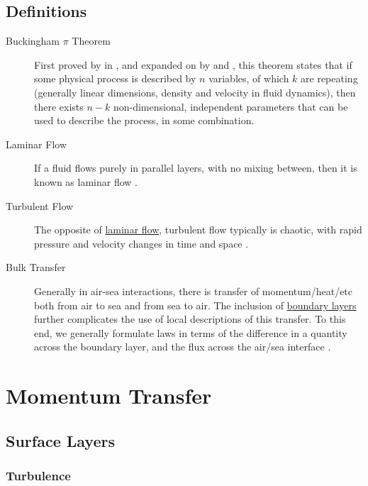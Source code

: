 \documentclass{report}
\begin{document}
\section{Definitions}
\label{definitions}
\begin{description}
\item[Buckingham $\pi$ Theorem] First proved by \citeauthor{bertrand78} in \citeyear{bertrand78}, and expanded on by \citet{rayleigh92} and \citet{buckingham14}, this theorem states that if some physical process is described by $n$ variables, of which $k$ are repeating (generally linear dimensions, density and velocity in fluid dynamics), then there exists $n-k$ non-dimensional, independent parameters that can be used to describe the process, in some combination.\label{def:buckingham}
\item[Laminar Flow] If a fluid flows purely in parallel layers, with no mixing between, then it is known as laminar flow \citep{batchelor00}.\label{def:laminar}
\item[Turbulent Flow] The opposite of \hyperref[def:laminar]{laminar flow}, turbulent flow typically is chaotic, with rapid pressure and velocity changes in time and space \citep{batchelor00}.\label{def:turbulent}
\item[Bulk Transfer] Generally in air-sea interactions, there is transfer of momentum/heat/etc both from air to sea and from sea to air. The inclusion of \hyperref[def:boundarylayer]{boundary layers} further complicates the use of local descriptions of this transfer. To this end, we generally formulate laws in terms of the difference in a quantity across the boundary layer, and the flux across the air/sea interface \citep{csanady04}. \label{def:bulk}
\end{description}

\chapter{Momentum Transfer}
\label{momentumtransfer}
    \lipsum[10]
  
    \section{Surface Layers}
\label{surfacelayers}
    \lipsum[1-2]

   \subsection{Turbulence}
\label{momturbulence} 
    \lipsum[1-2]
\end{document}
